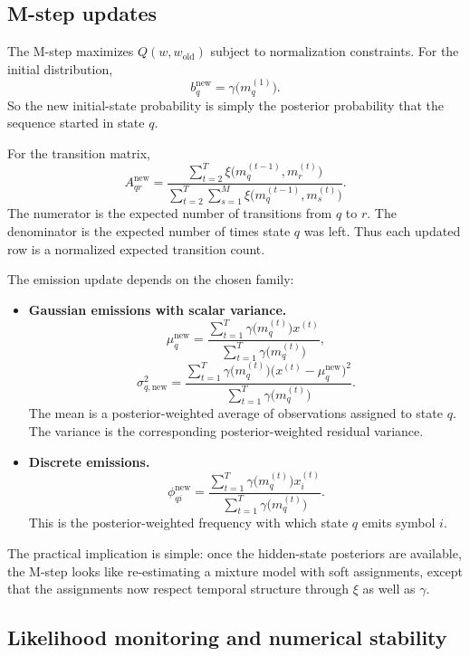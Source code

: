 \subsection{M-step updates}

The M-step maximizes $Q(w,w_{\text{old}})$ subject to normalization constraints. For the initial distribution,
\[
  b_q^{\text{new}}
  =
  \gamma\bigl(m_q^{(1)}\bigr).
\]
So the new initial-state probability is simply the posterior probability that the sequence started in state $q$.

For the transition matrix,
\[
  A_{qr}^{\text{new}}
  =
  \frac{\sum_{t=2}^{T}\xi\bigl(m_q^{(t-1)},m_r^{(t)}\bigr)}{
    \sum_{t=2}^{T}\sum_{s=1}^{M}\xi\bigl(m_q^{(t-1)},m_s^{(t)}\bigr)}.
\]
The numerator is the expected number of transitions from $q$ to $r$. The denominator is the expected number of times state $q$ was left. Thus each updated row is a normalized expected transition count.

The emission update depends on the chosen family:
\begin{itemize}
  \item \textbf{Gaussian emissions with scalar variance.}
  \[
    \mu_q^{\text{new}}
    =
    \frac{\sum_{t=1}^{T}\gamma\bigl(m_q^{(t)}\bigr)x^{(t)}}{
      \sum_{t=1}^{T}\gamma\bigl(m_q^{(t)}\bigr)},
  \]
  \[
    \sigma_{q,\text{new}}^2
    =
    \frac{\sum_{t=1}^{T}\gamma\bigl(m_q^{(t)}\bigr)\bigl(x^{(t)}-\mu_q^{\text{new}}\bigr)^2}{
      \sum_{t=1}^{T}\gamma\bigl(m_q^{(t)}\bigr)}.
  \]
  The mean is a posterior-weighted average of observations assigned to state $q$. The variance is the corresponding posterior-weighted residual variance.
  \item \textbf{Discrete emissions.}
  \[
    \phi_{qi}^{\text{new}}
    =
    \frac{\sum_{t=1}^{T}\gamma\bigl(m_q^{(t)}\bigr)x_i^{(t)}}{
      \sum_{t=1}^{T}\gamma\bigl(m_q^{(t)}\bigr)}.
  \]
  This is the posterior-weighted frequency with which state $q$ emits symbol $i$.
\end{itemize}

The practical implication is simple: once the hidden-state posteriors are available, the M-step looks like re-estimating a mixture model with soft assignments, except that the assignments now respect temporal structure through $\xi$ as well as $\gamma$.

\subsection{Likelihood monitoring and numerical stability}

